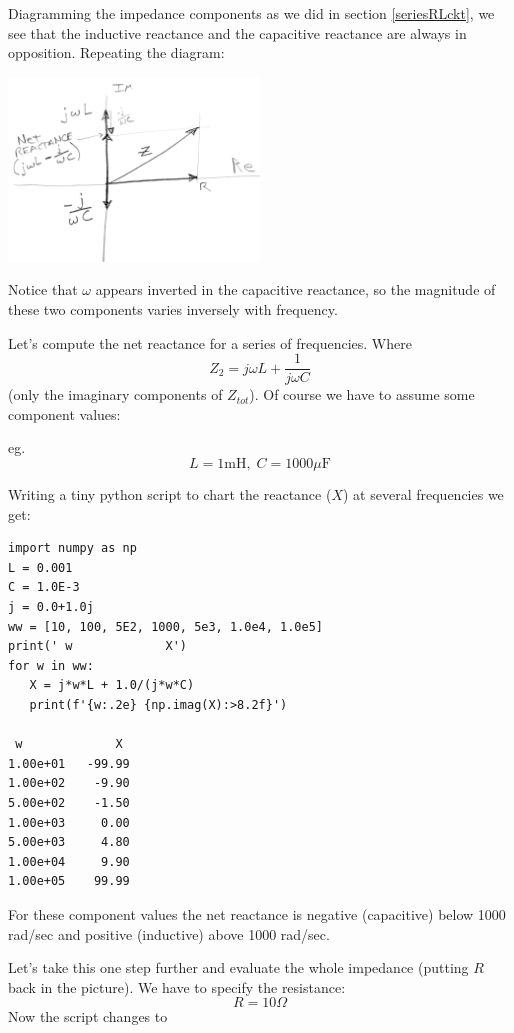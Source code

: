Diagramming the impedance components as we did in section \ref{seriesRLckt}, we see that
the inductive reactance and the capacitive reactance are always in opposition.  Repeating
the diagram:

\includegraphics[width=0.5\textwidth]{figsChapt02/HF41781.png}

Notice that $\omega$ appears inverted in the capacitive reactance, so the magnitude of these
two components varies inversely with frequency.

Let's compute the net reactance for a series of frequencies. Where
\[
Z_{2}  =  j\omega L + \frac {1}  {j\omega C}
\]
(only the imaginary components of $Z_{tot}$).
Of course we have to assume some component values:

eg.
\[
L = 1\text{mH},\; C = 1000\mu\text{F}
\]

Writing a tiny python script to
chart the reactance ($X$) at several frequencies we get:

\begin{verbatim}import numpy as np
L = 0.001
C = 1.0E-3
j = 0.0+1.0j
ww = [10, 100, 5E2, 1000, 5e3, 1.0e4, 1.0e5]
print(' w             X')
for w in ww:
   X = j*w*L + 1.0/(j*w*C)
   print(f'{w:.2e} {np.imag(X):>8.2f}')

 w             X
1.00e+01   -99.99
1.00e+02    -9.90
5.00e+02    -1.50
1.00e+03     0.00
5.00e+03     4.80
1.00e+04     9.90
1.00e+05    99.99
\end{verbatim}

For these component values the net reactance is negative (capacitive) below 1000 rad/sec
and positive (inductive) above 1000 rad/sec.

Let's take this one step further and evaluate the whole impedance (putting $R$ back in the picture).
We have to specify the resistance:
\[
R = 10\Omega
\]
Now the script changes to

